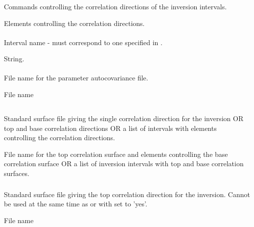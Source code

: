 \subsubsection{}
 \slist
   \item \Description Commands controlling the correlation directions of the inversion intervals.
   \item \Argument Elements controlling the correlation directions.
   \item \Default
 \elist

\paragraph{}
 \slist
   \item \Description Interval name - must correspond to one specified in .
   \item \Argument String.
   \item \Default
 \elist

\paragraph{}
 \slist
   \item \Description File name for the parameter autocovariance file.
   \item \Argument File name
   \item \Default
 \elist

\subsection{}
 \slist
   \item \Description Standard surface file giving the single correlation direction for the inversion OR top and base correlation directions OR a list of intervals with elements controlling the correlation directions.
   \item \Argument File name for the top correlation surface and elements controlling the base correlation surface OR a list of inversion intervals with top and base correlation surfaces.
   \item \Default
 \elist

\subsubsection{}
 \slist
   \item \Description Standard surface file giving the top correlation direction for the inversion. Cannot be used at the same time as  or with  set to 'yes'.
   \item \Argument File name
   \item \Default
 \elist

